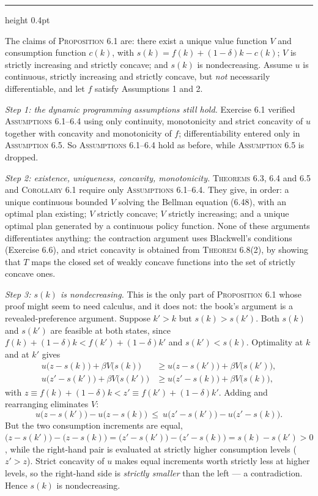 \documentclass[11pt,letterpaper,reqno]{amsart}
\makeatletter
\newcommand{\as@head}[3]{%
  \par\addvspace{1.6ex}\penalty-200\relax
  \phantomsection
  \addcontentsline{toc}{subsection}{#1 #2\texorpdfstring{\ifx\relax#3\relax\else\quad #3\fi}{}}%
  {\color{RuleGrey}\hrule height 0.4pt}%
  \nobreak\vspace{0.8ex}\nobreak
  \noindent{\bfseries #1 #2}%
  \ifx\relax#3\relax\else\quad{\bfseries\itshape #3}\fi
  \par\nobreak\vspace{0.4ex}\nobreak
  \as@beginstatement
}
\newcommand{\as@beginstatement}{\begingroup\itshape\ignorespaces}
\newenvironment{aex}[2]{\as@head{Exercise}{#1}{#2}}{\par\addvspace{1.2ex}}
\newcommand{\bk}[1]{\textup{\textsc{#1}}}
\renewcommand{\as@beginstatement}{\ignorespaces}
\makeatother
\begin{document}
\begin{aex}{6.20}{}
The claims of \bk{Proposition 6.1} are: there exist a unique value function $V$ and consumption function
$c(k)$, with $s(k)=f(k)+(1-\delta)k-c(k)$; $V$ is strictly increasing and strictly concave; and $s(k)$ is
nondecreasing.  Assume $u$ is continuous, strictly increasing and strictly concave, but \emph{not}
necessarily differentiable, and let $f$ satisfy Assumptions 1 and 2.

\emph{Step 1: the dynamic programming assumptions still hold.}  Exercise 6.1 verified
\bk{Assumptions 6.1--6.4} using only continuity, monotonicity and strict concavity of $u$ together with
concavity and monotonicity of $f$; differentiability entered only in \bk{Assumption 6.5}.  So
\bk{Assumptions 6.1--6.4} hold as before, while \bk{Assumption 6.5} is dropped.

\emph{Step 2: existence, uniqueness, concavity, monotonicity.}  \bk{Theorems 6.3, 6.4} and \bk{6.5} and
\bk{Corollary 6.1} require only \bk{Assumptions 6.1--6.4}.  They give, in order: a unique continuous
bounded $V$ solving the Bellman equation \bk{(6.48)}, with an optimal plan existing; $V$ strictly concave;
$V$ strictly increasing; and a unique optimal plan generated by a continuous policy function.  None of
these arguments differentiates anything: the contraction argument uses Blackwell's conditions (Exercise
6.6), and strict concavity is obtained from \bk{Theorem 6.8}(2), by showing that $T$ maps the closed set of
weakly concave functions into the set of strictly concave ones.

\emph{Step 3: $s(k)$ is nondecreasing.}  This is the only part of \bk{Proposition 6.1} whose proof might
seem to need calculus, and it does not: the book's argument is a revealed-preference argument.  Suppose
$k'>k$ but $s(k)>s(k')$.  Both $s(k)$ and $s(k')$ are feasible at both states, since
$f(k)+(1-\delta)k<f(k')+(1-\delta)k'$ and $s(k')<s(k)$.  Optimality at $k$ and at $k'$ gives
\begin{align*}
u\bigl(z-s(k)\bigr)+\beta V\bigl(s(k)\bigr)&\ge u\bigl(z-s(k')\bigr)+\beta V\bigl(s(k')\bigr),\\
u\bigl(z'-s(k')\bigr)+\beta V\bigl(s(k')\bigr)&\ge u\bigl(z'-s(k)\bigr)+\beta V\bigl(s(k)\bigr),
\end{align*}
with $z\equiv f(k)+(1-\delta)k<z'\equiv f(k')+(1-\delta)k'$.  Adding and rearranging eliminates $V$:
\[
u\bigl(z-s(k')\bigr)-u\bigl(z-s(k)\bigr)\ \le\ u\bigl(z'-s(k')\bigr)-u\bigl(z'-s(k)\bigr).
\]
But the two consumption increments are equal, $\bigl(z-s(k')\bigr)-\bigl(z-s(k)\bigr)=
\bigl(z'-s(k')\bigr)-\bigl(z'-s(k)\bigr)=s(k)-s(k')>0$, while the right-hand pair is evaluated at strictly
higher consumption levels ($z'>z$).  Strict concavity of $u$ makes equal increments worth strictly less at
higher levels, so the right-hand side is \emph{strictly smaller} than the left --- a contradiction.  Hence
$s(k)$ is nondecreasing.


\end{aex}
\end{document}

